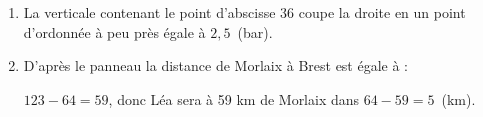 
\medskip

\begin{enumerate}
\item %

%
%
%
La verticale contenant le point d’abscisse 36 coupe la droite en un point d’ordonnée à peu près égale à $2,5$~(bar).
\item %

%
D’après le panneau la distance de Morlaix à Brest est égale à :

$123 - 64 = 59$, donc Léa sera à 59 km de Morlaix dans $64 - 59 = 5$~(km).
\end{enumerate}
 
\vspace{0,5cm}

